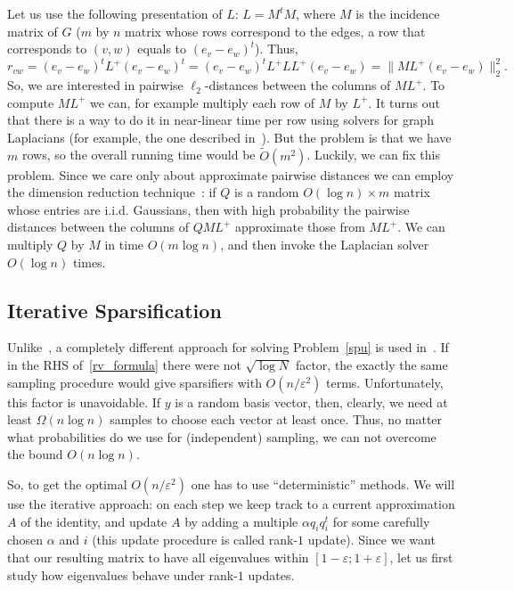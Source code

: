 \documentclass[12pt]{article}
\newcommand{\eps}{\varepsilon}
\begin{document}
    Let us use the following presentation of $L$: $L = M^t M$, where $M$ is the incidence
    matrix of $G$ ($m$ by $n$ matrix whose rows correspond to the edges, a row that
    corresponds to $(v, w)$ equals to $(e_v - e_w)^t$). Thus,
    $$
        r_{vw} = (e_v - e_w)^t L^+ (e_v - e_w)^t = (e_v - e_w)^t L^+ L L^+ (e_v - e_w) =
        \|M L^+ (e_v - e_w)\|_2^2.
    $$
    So, we are interested in pairwise $\ell_2$-distances between the columns of
    $M L^+$.
    To compute $M L^+$ we can, for example multiply each row of $M$ by $L^+$. It turns
    out that there is a way to do it in near-linear time per row using solvers for graph
    Laplacians (for example, the one described in~\cite{KMP10}).
    But the problem is that we have $m$ rows, so the overall running time would be
    $\tilde{O}(m^2)$.
    Luckily, we can fix this problem. Since we care only about approximate pairwise
    distances we can employ the dimension reduction technique~\cite{DG03}:
    if $Q$ is a random
    $O(\log n) \times m$ matrix whose entries are i.i.d. Gaussians, then with
    high probability the pairwise distances between the columns of $QML^{+}$ approximate
    those from $ML^+$. We can multiply $Q$ by $M$ in time $O(m \log n)$, and then
    invoke the Laplacian solver $O(\log n)$ times.

    \subsection{Iterative Sparsification}

    Unlike~\cite{SS11}, a completely different approach for solving Problem~\ref{spu}
    is used in~\cite{BSS09}.
    If in the RHS of~\ref{rv_formula} there were not $\sqrt{\log N}$ factor, the exactly
    the same sampling procedure would give sparsifiers with $O(n / \eps^2)$ terms.
    Unfortunately, this factor is unavoidable.
    If $y$ is a random basis vector, then, clearly, we need at least $\Omega(n \log n)$
    samples to choose each vector at least once.
    Thus, no matter what probabilities do we use for (independent) sampling, we can not
    overcome the bound $O(n \log n)$.

    So, to get the optimal $O(n / \eps^2)$ one has to use ``deterministic'' methods.
    We will use the iterative approach: on each step we keep track to a current approximation
    $A$ of the identity, and update $A$ by adding a multiple $\alpha q_i q_i^t$ for some
    carefully chosen $\alpha$ and $i$ (this update procedure is called rank-$1$ update).
    Since we want that our resulting matrix to have all eigenvalues within
    $[1 - \eps; 1 + \eps]$, let us first study how eigenvalues behave under rank-$1$
    updates.
\end{document}

